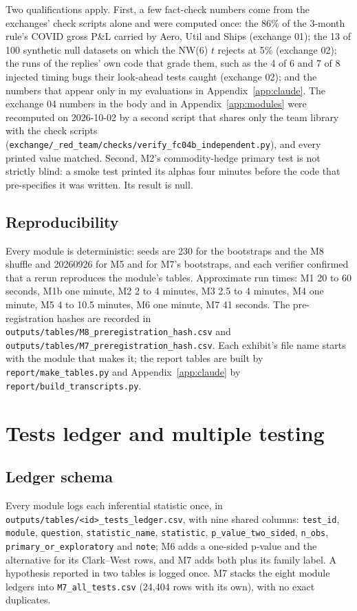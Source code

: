 Two qualifications apply. First, a few fact-check numbers come from the exchanges' check scripts alone and were computed once: the 86\% of the 3-month rule's COVID gross P\&L carried by Aero, Util and Ships (exchange 01); the 13 of 100 synthetic null datasets on which the NW(6) $t$ rejects at 5\% (exchange 02); the runs of the replies' own code that grade them, such as the 4 of 6 and 7 of 8 injected timing bugs their look-ahead tests caught (exchange 02); and the numbers that appear only in my evaluations in Appendix~\ref{app:claude}. The exchange 04 numbers in the body and in Appendix~\ref{app:modules} were recomputed on 2026-10-02 by a second script that shares only the team library with the check scripts (\texttt{exchange/\_red\_team/\allowbreak checks/\allowbreak verify\_fc04b\_independent.py}), and every printed value matched. Second, M2's commodity-hedge primary test is not strictly blind: a smoke test printed its alphas four minutes before the code that pre-specifies it was written. Its result is null.

\subsection{Reproducibility}
Every module is deterministic: seeds are 230 for the bootstraps and the M8 shuffle and 20260926 for M5 and for M7's bootstraps, and each verifier confirmed that a rerun reproduces the module's tables. Approximate run times: M1 20 to 60 seconds, M1b one minute, M2 2 to 4 minutes, M3 2.5 to 4 minutes, M4 one minute, M5 4 to 10.5 minutes, M6 one minute, M7 41 seconds. The pre-registration hashes are recorded in \texttt{outputs/tables/M8\_preregistration\_hash.csv} and \texttt{outputs/tables/M7\_preregistration\_hash.csv}. Each exhibit's file name starts with the module that makes it; the report tables are built by \texttt{report/make\_tables.py} and Appendix~\ref{app:claude} by \texttt{report/build\_transcripts.py}.

\clearpage
\section{Tests ledger and multiple testing}
\label{app:ledger}

\subsection{Ledger schema}
{\raggedright Every module logs each inferential statistic once, in \texttt{outputs/tables/<id>\_tests\_ledger.csv}, with nine shared columns: \texttt{test\_id}, \texttt{module}, \texttt{question}, \texttt{statistic\_name}, \texttt{statistic}, \texttt{p\_value\_two\_sided}, \texttt{n\_obs}, \texttt{primary\_or\_exploratory} and \texttt{note}; M6 adds a one-sided p-value and the alternative for its Clark--West rows, and M7 adds both plus its family label. A hypothesis reported in two tables is logged once. M7 stacks the eight module ledgers into \texttt{M7\_all\_tests.csv} (24,404 rows with its own), with no exact duplicates.\par}

